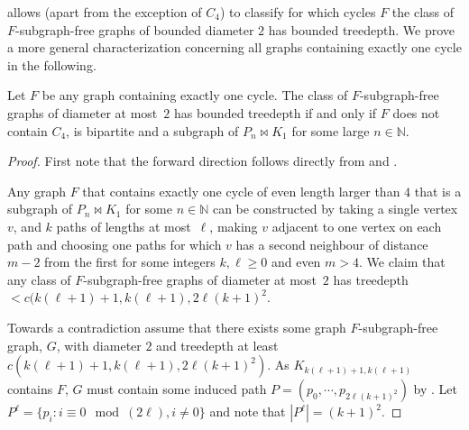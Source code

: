 \documentclass[runningheads,envcountsame]{llncs}
\newcommand{\forbiddenGraph}{F}
\newcommand{\join}{\bowtie}
\begin{document}
 allows (apart from the exception of $C_4$) to classify for which cycles $\forbiddenGraph$ the class of $\forbiddenGraph$-subgraph-free graphs of bounded diameter $2$ has bounded treedepth. We prove a more general characterization concerning all graphs containing exactly one cycle in the following.

\begin{theorem}
\label{thm:diam2-unicyclic}
    Let $\forbiddenGraph$ be any graph containing exactly one cycle. The class of $\forbiddenGraph$-subgraph-free graphs of diameter at most~$2$ has bounded treedepth if and only if $\forbiddenGraph$ does not contain $C_4$, is bipartite and a subgraph of $P_n \join K_1$ for some large $n\in \mathbb{N}$.
\end{theorem}
\begin{proof}
    First note that the forward direction follows directly from  and .
    
    Any graph $\forbiddenGraph$ that contains exactly one cycle of even length larger than $4$ that is a subgraph of $P_n \join K_1$ for some $n\in \mathbb{N}$ can be constructed by taking a single vertex $v$, and $k$ paths of lengths at most~$\ell$, making $v$ adjacent to one vertex on each path and choosing one paths for which $v$ has a second neighbour of distance $m-2$ from the first for some integers $k, \ell \geq 0$ and even $m>4$.  We claim that any class of $\forbiddenGraph$-subgraph-free graphs of diameter at most~$2$ has treedepth $< c(k(\ell+1)+1,k(\ell+1),2\ell(k+1)^2$.
    
    Towards a contradiction assume that there exists some graph $\forbiddenGraph$-subgraph-free graph, $G$, with diameter $2$ and treedepth at least $c(k(\ell+1)+1,k(\ell+1),2\ell(k+1)^2)$. As $K_{k(\ell+1)+1,k(\ell+1)}$ contains $\forbiddenGraph$, $G$ must contain some induced path $P = (p_0,\cdots, p_{2\ell(k+1)^2})$ by . Let $P^\ell = \{ p_i: i\equiv 0 \mod (2\ell), i\not=0\}$ and note that $|P^\ell| = (k+1)^2$.
    

\end{proof}
\end{document}
